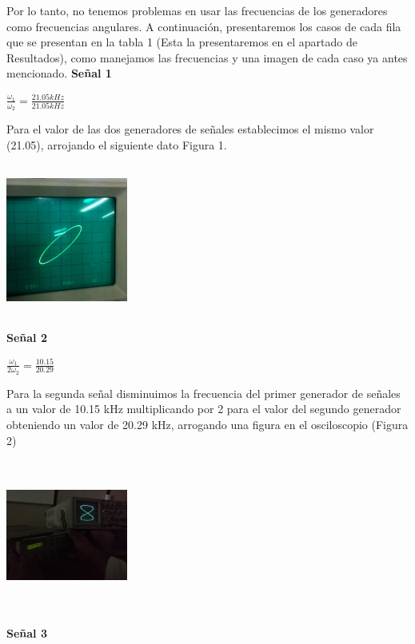 \documentclass[10pt]{article}
\begin{document}
\begin{multicols}{2}
Por lo tanto, no tenemos problemas en usar las frecuencias de los generadores como frecuencias angulares.
A continuación, presentaremos los casos de cada fila que se presentan en la tabla 1 (Esta la presentaremos en el apartado de Resultados), como manejamos las frecuencias y una imagen de cada caso ya antes mencionado.
\textbf{Señal 1}\\
\begin{center}
   $ \frac{\omega_{1}}{\omega_{2}}=\frac{21.05 kHz }{21.05 kHz }$\\
\end{center}

Para el valor de las dos  generadores de señales establecimos el mismo valor (21.05), arrojando el siguiente dato Figura 1.\\

\begin{center}
	\includegraphics[width=4cm,height=5cm]{Imagenes/1.png}
	\label{fig:1}
\end{center}
\textbf{Señal 2}\\
\begin{center}
    
$\frac{\omega_{1}}{2\omega_{2}}=\frac{10.15}{20.29}$\\
\end{center}
Para la segunda señal disminuimos la frecuencia del primer generador de señales a un valor de 10.15 kHz multiplicando por 2 para el valor del segundo generador obteniendo un valor de 20.29 kHz, arrogando una figura en el osciloscopio (Figura 2)\\
\begin{center}
	\includegraphics[width=4cm,height=5cm]{Imagenes/2.png}
	\label{fig:2}
\end{center}
\textbf{Señal 3}\\
\begin{center}
    

\end{center}
\end{multicols}
\end{document}
